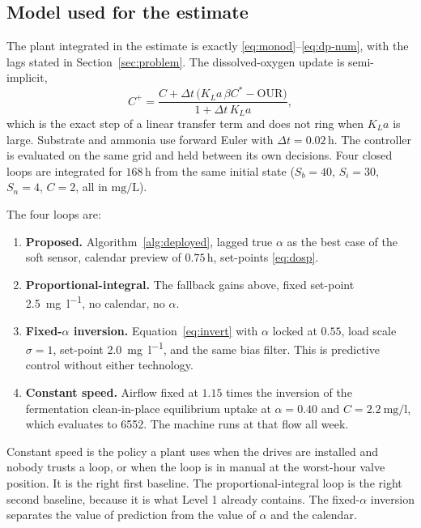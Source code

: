\subsection{Model used for the estimate}

The plant integrated in the estimate is exactly \eqref{eq:monod}--\eqref{eq:dp-num}, with the lags stated in Section~\ref{sec:problem}. The dissolved-oxygen update is semi-implicit,
\begin{equation}
\label{eq:semi}
C^{+}
=
\frac{
C
+
\Delta t\,
\big(
K_La\,\beta C^{*}
-
\mathrm{OUR}
\big)
}{
1
+
\Delta t\,
K_La
},
\end{equation}
which is the exact step of a linear transfer term and does not ring when $K_La$ is large. Substrate and ammonia use forward Euler with $\Delta t=0.02\,\mathrm{h}$. The controller is evaluated on the same grid and held between its own decisions. Four closed loops are integrated for $168\,\mathrm{h}$ from the same initial state ($S_{b}=40$, $S_{i}=30$, $S_{n}=4$, $C=2$, all in $\mathrm{mg/L}$).

The four loops are:

\begin{enumerate}[leftmargin=1.6em,itemsep=0.35em]
\item \textbf{Proposed.} Algorithm~\ref{alg:deployed}, lagged true $\alpha$ as the best case of the soft sensor, calendar preview of $0.75\,\mathrm{h}$, set-points \eqref{eq:dosp}.
\item \textbf{Proportional-integral.} The fallback gains above, fixed set-point \SI{2.5}{\milli\gram\per\litre}, no calendar, no $\alpha$.
\item \textbf{Fixed-$\alpha$ inversion.} Equation~\eqref{eq:invert} with $\alpha$ locked at $0.55$, load scale $\sigma=1$, set-point \SI{2.0}{\milli\gram\per\litre}, and the same bias filter. This is predictive control without either technology.
\item \textbf{Constant speed.} Airflow fixed at $1.15$ times the inversion of the fermentation clean-in-place equilibrium uptake at $\alpha=0.40$ and $C=\SI{2.2}{\milli\gram\per\litre}$, which evaluates to \SI{6552}{\nmcph}. The machine runs at that flow all week.
\end{enumerate}

Constant speed is the policy a plant uses when the drives are installed and nobody trusts a loop, or when the loop is in manual at the worst-hour valve position. It is the right first baseline. The proportional-integral loop is the right second baseline, because it is what Level 1 already contains. The fixed-$\alpha$ inversion separates the value of prediction from the value of $\alpha$ and the calendar.

